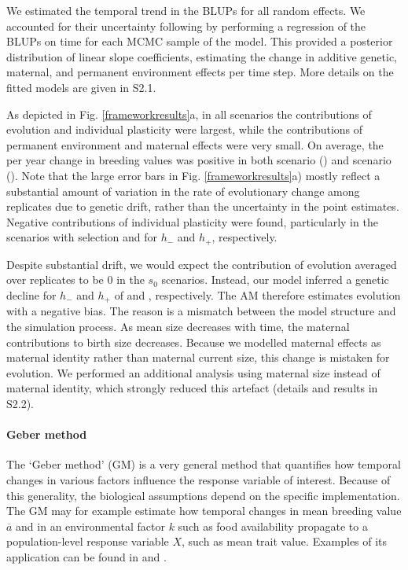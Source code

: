 We estimated the temporal trend in the BLUPs for all random effects. We accounted for their uncertainty following \cite{Hadfield2010b} by performing a regression of the BLUPs on time for each MCMC sample of the model. This provided a posterior distribution of linear slope coefficients, estimating the change in additive genetic, maternal, and permanent environment effects per time step. More details on the fitted models are given in S2.1.

As depicted in Fig. \ref{frameworkresults}a, in all scenarios the contributions of evolution and individual plasticity were largest, while the contributions of permanent environment and maternal effects were very small. On average, the per year change in breeding values was positive in both scenario \Sh () and scenario \SH (). Note that the large error bars in Fig. \ref{frameworkresults}a) mostly reflect a substantial amount of variation in the rate of evolutionary change among replicates due to genetic drift, rather than the uncertainty in the point estimates. Negative contributions of individual plasticity were found, particularly in the scenarios with selection  and  for $h_{-}$ and $h_+$, respectively.

Despite substantial drift, we would expect the contribution of evolution averaged over replicates to be 0 in the $s_0$ scenarios. Instead, our model inferred a genetic decline for $h_{-}$ and $h_+$  of  and , respectively. The AM therefore estimates evolution with a negative bias. The reason is a mismatch between the model structure and the simulation process. As mean size decreases with time, the maternal contributions to birth size decreases. Because we modelled maternal effects as maternal identity rather than maternal current size, this change is mistaken for evolution. We performed an additional analysis using maternal size instead of maternal identity, which strongly reduced this artefact (details and results in S2.2).

\paragraph{Geber method}
The `Geber method' (GM) \parencite{Hairston2005} is a very general method that quantifies how temporal changes in various factors influence the response variable of interest. Because of this generality, the biological assumptions depend on the specific implementation. The GM may for example estimate how temporal changes in mean breeding value $\overline{a}$ and in an environmental factor $k$ such as food availability propagate to a population-level response variable $X$, such as mean trait value. Examples of its application can be found in \cite{Ellner2011} and \cite{Becks2012}.

